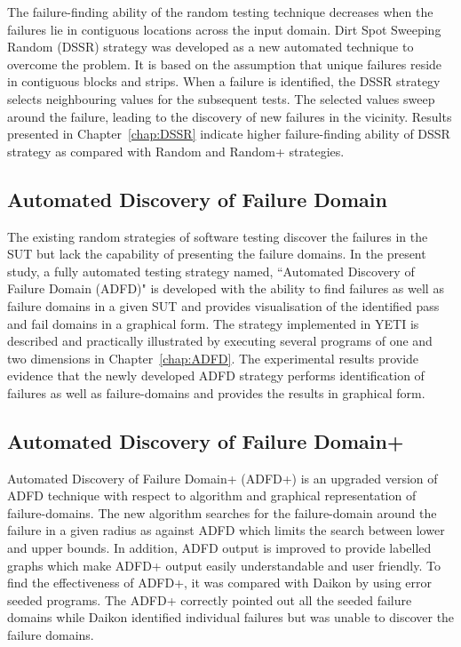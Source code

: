 The failure-finding ability of the random testing technique decreases when the failures lie in contiguous locations across the input domain. Dirt Spot Sweeping Random (DSSR) strategy was developed as a new automated technique to overcome the problem. It is based on the assumption that unique failures reside in contiguous blocks and strips. When a failure is identified, the DSSR strategy selects neighbouring values for the subsequent tests. The selected values sweep around the failure, leading to the discovery of new failures in the vicinity. Results presented in Chapter~\ref{chap:DSSR} indicate higher failure-finding ability of DSSR strategy as compared with Random and Random+ strategies.

\subsection{Automated Discovery of Failure Domain}
The existing random strategies of software testing discover the failures in the SUT but lack the capability of presenting the failure domains. In the present study, a fully automated testing strategy named, ``Automated Discovery of Failure Domain (ADFD)" is developed with the ability to find failures as well as failure domains in a given SUT and provides visualisation of the identified pass and fail domains in a graphical form. The strategy implemented in YETI is described and practically illustrated by executing several programs of one and two dimensions in Chapter~\ref{chap:ADFD}. The experimental results provide evidence that the newly developed ADFD strategy performs identification of failures as well as failure-domains and provides the results in graphical form.

\subsection{Automated Discovery of Failure Domain+}
Automated Discovery of Failure Domain+ (ADFD+) is an upgraded version of ADFD technique with respect to algorithm and graphical representation of failure-domains. The new algorithm searches for the failure-domain around the failure in a given radius as against ADFD which limits the search between lower and upper bounds. In addition, ADFD output is improved to provide labelled graphs which make ADFD+ output easily understandable and user friendly. To find the effectiveness of ADFD+, it was compared with Daikon by using error seeded programs. The ADFD+ correctly pointed out all the seeded failure domains while Daikon identified individual failures but was unable to discover the failure domains.

